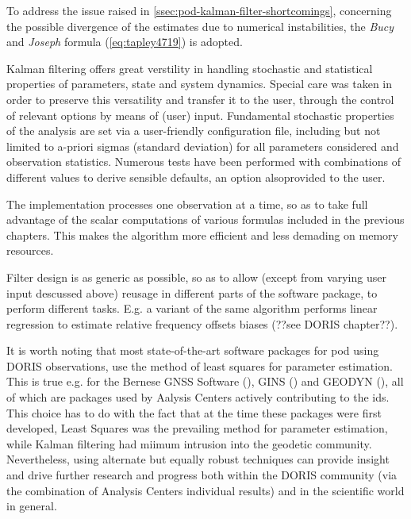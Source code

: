 To address the issue raised in \autoref{ssec:pod-kalman-filter-shortcomings}, 
concerning the possible divergence of the estimates due to numerical instabilities, 
the \emph{Bucy} and \emph{Joseph} formula (\autoref{eq:tapley4719}) is adopted.

Kalman filtering offers great verstility in handling stochastic and statistical 
properties of parameters, state and system dynamics. Special care was taken in 
order to preserve this versatility and transfer it to the user, through the control
of relevant options by means of (user) input. Fundamental stochastic properties of 
the analysis are set via a user-friendly configuration file, including but not 
limited to a-priori sigmas (standard deviation) for all parameters considered and 
observation statistics. Numerous tests have been performed with combinations of 
different values to derive sensible defaults, an option alsoprovided to the user.

The implementation processes one observation at a time, so as to take full advantage 
of the scalar computations of various formulas included in the previous chapters. 
This makes the algorithm more efficient and less demading on memory resources.

Filter design is as generic as possible, so as to allow (except from varying user 
input descussed above) reusage in different parts of the software package, to perform 
different tasks. E.g. a variant of the same algorithm performs linear regression 
to estimate relative frequency offsets biases (??see DORIS chapter??).

It is worth noting that most state-of-the-art software packages for \gls{pod} using 
DORIS observations, use the method of least squares for parameter estimation. This 
is true e.g. for the Bernese GNSS Software (\cite{Dach2015}), GINS (\cite{Gins2013}) and 
GEODYN (\cite{Geodyn2013}), all of which are packages used by Aalysis Centers 
actively contributing to the \gls{ids}. This choice has to do with the fact that 
at the time these packages were first developed, Least Squares was the prevailing 
method for parameter estimation, while Kalman filtering had miimum intrusion into the 
geodetic community. Nevertheless, using alternate but equally robust techniques 
can provide insight and drive further research and progress both within the DORIS 
community (via the combination of Analysis Centers individual results) and in the 
scientific world in general.
